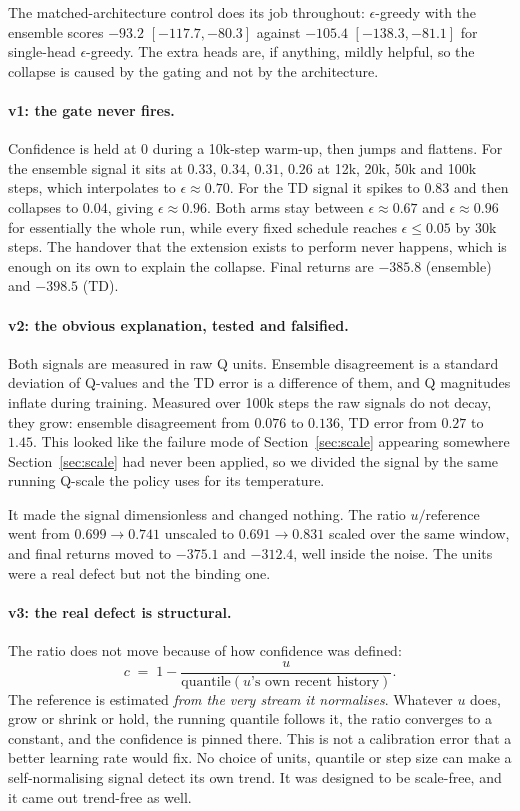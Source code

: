 \documentclass[11pt,a4paper]{article}
\begin{document}
The matched-architecture control does its job throughout: $\epsilon$-greedy
with the ensemble scores $-93.2$ $[-117.7, -80.3]$ against $-105.4$
$[-138.3, -81.1]$ for single-head $\epsilon$-greedy. The extra heads are, if
anything, mildly helpful, so the collapse is caused by the gating and not by
the architecture.

\paragraph{v1: the gate never fires.}
Confidence is held at $0$ during a 10k-step warm-up, then jumps and flattens.
For the ensemble signal it sits at $0.33$, $0.34$, $0.31$, $0.26$ at 12k, 20k,
50k and 100k steps, which interpolates to $\epsilon \approx 0.70$. For the TD
signal it spikes to $0.83$ and then collapses to $0.04$, giving
$\epsilon \approx 0.96$. Both arms stay between $\epsilon \approx 0.67$ and
$\epsilon \approx 0.96$ for essentially the whole run, while every fixed
schedule reaches $\epsilon \leq 0.05$ by 30k steps. The handover that the
extension exists to perform never happens, which is enough on its own to
explain the collapse. Final returns are $-385.8$ (ensemble) and $-398.5$ (TD).

\paragraph{v2: the obvious explanation, tested and falsified.}
Both signals are measured in raw Q units. Ensemble disagreement is a standard
deviation of Q-values and the TD error is a difference of them, and Q
magnitudes inflate during training. Measured over 100k steps the raw signals do
not decay, they grow: ensemble disagreement from $0.076$ to $0.136$, TD error
from $0.27$ to $1.45$. This looked like the failure mode of
Section~\ref{sec:scale} appearing somewhere Section~\ref{sec:scale} had never
been applied, so we divided the signal by the same running Q-scale the policy
uses for its temperature.

It made the signal dimensionless and changed nothing. The ratio
$u/\text{reference}$ went from $0.699 \to 0.741$ unscaled to $0.691 \to 0.831$
scaled over the same window, and final returns moved to $-375.1$ and $-312.4$,
well inside the noise. The units were a real defect but not the binding one.

\paragraph{v3: the real defect is structural.}
The ratio does not move because of how confidence was defined:
\begin{equation}
c \;=\; 1 - \frac{u}{\mathrm{quantile}(u\text{'s own recent history})}.
\label{eq:confidence}
\end{equation}
The reference is estimated \emph{from the very stream it normalises}. Whatever
$u$ does, grow or shrink or hold, the running quantile follows it, the ratio
converges to a constant, and the confidence is pinned there. This is not a
calibration error that a better learning rate would fix. No choice of units,
quantile or step size can make a self-normalising signal detect its own trend.
It was designed to be scale-free, and it came out trend-free as well.
\end{document}
